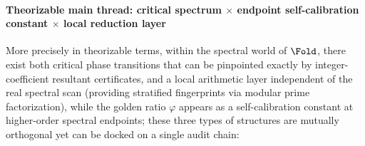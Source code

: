\paragraph{Theorizable main thread: critical spectrum \texorpdfstring{$\times$}{x} endpoint self-calibration constant \texorpdfstring{$\times$}{x} local reduction layer}
More precisely in theorizable terms, within the spectral world of \(\Fold\), there exist both critical phase transitions that can be pinpointed exactly by integer-coefficient resultant certificates, and a local arithmetic layer independent of the real spectral scan (providing stratified fingerprints via modular prime factorization), while the golden ratio \(\varphi\) appears as a self-calibration constant at higher-order spectral endpoints; these three types of structures are mutually orthogonal yet can be docked on a single audit chain:
